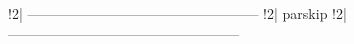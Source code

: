 !2| --------------------------------------------------
!2| {parskip}
!2| --------------------------------------------------

\usepackage{parskip}
